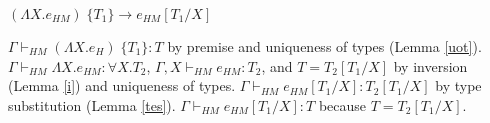 \begin{case}
$(\Lambda X.e_{HM})\;\lbrace T_{1}\rbrace\rightarrow e_{HM}[T_{1}/X]$

$\Gamma\vdash_{HM}(\Lambda X.e_{H})\;\lbrace T_{1}\rbrace:T$ by premise and uniqueness of types (Lemma \ref{uot}).  $\Gamma\vdash_{HM}\Lambda X.e_{HM}:\forall X.T_{2}$, $\Gamma,X\vdash_{HM}e_{HM}:T_{2}$, and $T=T_{2}[T_{1}/X]$ by inversion (Lemma \ref{i}) and uniqueness of types.  $\Gamma\vdash_{HM}e_{HM}[T_{1}/X]:T_{2}[T_{1}/X]$ by type substitution (Lemma \ref{tes}).  $\Gamma\vdash_{HM}e_{HM}[T_{1}/X]:T$ because $T=T_{2}[T_{1}/X]$.
\end{case}